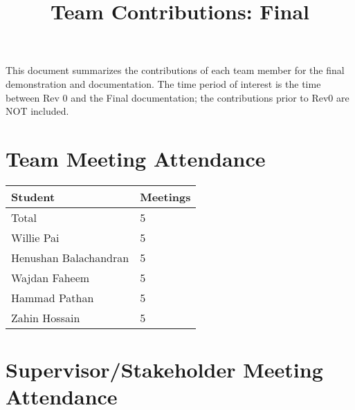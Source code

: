 \documentclass{article}
\title{Team Contributions: Final\\\progname}
\author{\authname}
\date{}
\begin{document}
\maketitle

This document summarizes the contributions of each team member for the final
demonstration and documentation.  The time period of interest is the time
between Rev 0 and the Final documentation; the contributions prior to Rev0 are
NOT included.

\section{Team Meeting Attendance}


\begin{table}[H]
\centering
\begin{tabular}{ll}
\toprule
\textbf{Student} & \textbf{Meetings}\\
\midrule
Total & 5\\
Willie Pai & 5\\
Henushan Balachandran & 5\\
Wajdan Faheem & 5\\
Hammad Pathan & 5\\
Zahin Hossain & 5\\
\bottomrule
\end{tabular}
\end{table}


\section{Supervisor/Stakeholder Meeting Attendance}

\end{document}
